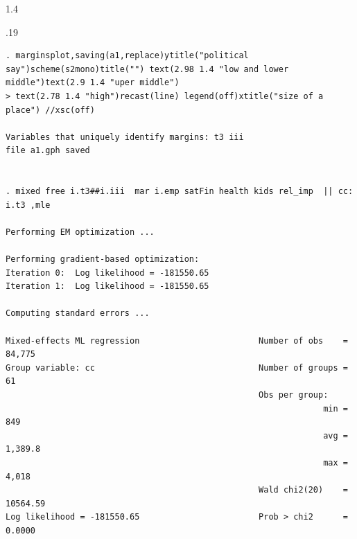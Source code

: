 \documentclass[10pt, letterpaper]{article}
\begin{document}
\begin{spacing}{1.4}
\begin{scriptsize}
\begin{spacing}{.19}
\begin{verbatim}
. marginsplot,saving(a1,replace)ytitle("political say")scheme(s2mono)title("") text(2.98 1.4 "low and lower middle")text(2.9 1.4 "uper middle")
> text(2.78 1.4 "high")recast(line) legend(off)xtitle("size of a place") //xsc(off)

Variables that uniquely identify margins: t3 iii
file a1.gph saved


. mixed free i.t3##i.iii  mar i.emp satFin health kids rel_imp  || cc:  i.t3 ,mle

Performing EM optimization ...

Performing gradient-based optimization: 
Iteration 0:  Log likelihood = -181550.65  
Iteration 1:  Log likelihood = -181550.65  

Computing standard errors ...

Mixed-effects ML regression                        Number of obs    =   84,775
Group variable: cc                                 Number of groups =       61
                                                   Obs per group:
                                                                min =      849
                                                                avg =  1,389.8
                                                                max =    4,018
                                                   Wald chi2(20)    = 10564.59
Log likelihood = -181550.65                        Prob > chi2      =   0.0000


\end{verbatim}
\end{spacing}
\end{scriptsize}
\end{spacing}
\end{document}
